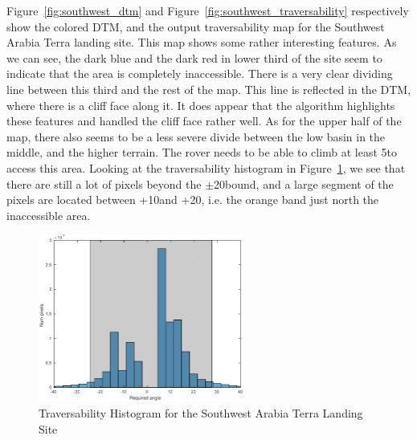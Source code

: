 \documentclass[12pt]{article}
\begin{document}
\par Figure~\ref{fig:southwest_dtm} and Figure~\ref{fig:southwest_traversability} respectively show the colored DTM, and the output traversability map for the Southwest Arabia Terra landing site. This map shows some rather interesting features. As we can see, the dark blue and the dark red in lower third of the site seem to indicate that the area is completely inaccessible. There is a very clear dividing line between this third and the rest of the map. This line is reflected in the DTM, where there is a cliff face along it. It does appear that the algorithm highlights these features and handled the cliff face rather well. As for the upper half of the map, there also seems to be a less severe divide between the low basin in the middle, and the higher terrain. The rover needs to be able to climb at least 5\textdegree to access this area. Looking at the traversability histogram in Figure~\ref{fig:southwest_hist}, we see that there are still a lot of pixels beyond the $\pm$20\textdegree bound, and a large segment of the pixels are located between +10\textdegree and +20\textdegree, i.e. the orange band just north the inaccessible area.
\begin{figure}[h!]
  \centering
  \includegraphics[width=0.6\textwidth]{figures/maps/ESP_011844_1855/DTEEC_011844_1855_002812_1855_A01-hist.pdf}
  \caption{Traversability Histogram for the Southwest Arabia Terra Landing Site}
  \label{fig:southwest_hist}
\end{figure}
\end{document}
